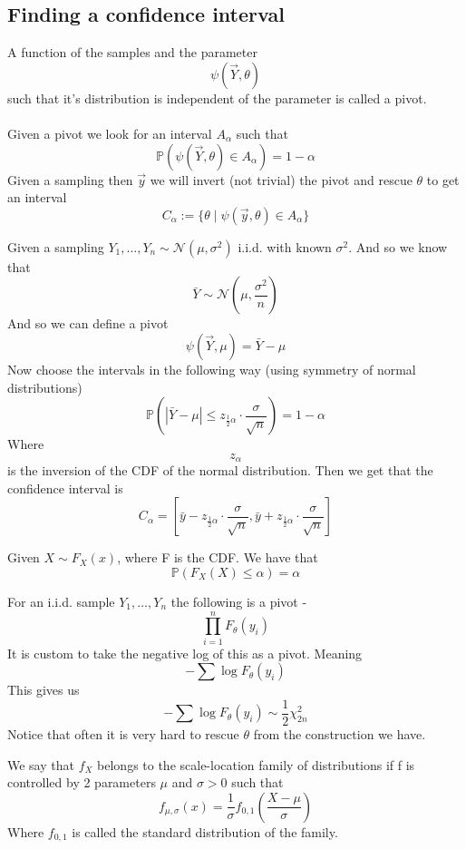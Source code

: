\documentclass[../main.tex]{subfiles}
\begin{document}
\subsection{Finding a confidence interval}
\begin{definition}
A function of the samples and the parameter
\[\psi\left(\overrightarrow{Y}, \theta\right)\]
such that it's distribution is independent of the parameter is called a pivot.\\\\
Given a pivot we look for an interval $A_{\alpha}$ such that
\[\mathbb{P}\left(\psi\left(\overrightarrow{Y},\theta\right)\in A_{\alpha}\right) = 1-\alpha\]
Given a sampling then $\overrightarrow{y}$ we will invert (not trivial) the pivot and rescue $\theta$ to get an interval
\[C_{\alpha}:=\{\theta\mid \psi(\overrightarrow{y}, \theta)\in A_{\alpha}\}\]
\end{definition}
\begin{example}
Given a sampling $Y_1,\dots,Y_n\sim\mathcal{N}(\mu, \sigma^2)$ i.i.d. with known $\sigma^2$. And so we know that
\[\bar{Y}\sim\mathcal{N}\left(\mu,\frac{\sigma^2}{n}\right)\] And so we can define a pivot
\[\psi\left(\overrightarrow{Y},\mu\right) = \bar{Y}-\mu\]
Now choose the intervals in the following way (using symmetry of normal distributions)
\[\mathbb{P}\left(|\bar{Y}-\mu|\leq z_{\frac{1}{2}\alpha} \cdot\frac{\sigma}{\sqrt{n}}\right) = 1-\alpha\]
Where \[z_{\alpha}\] is the inversion of the CDF of the normal distribution. 
Then we get that the confidence interval is 
\[C_{\alpha} = \left[\bar{y}-z_{\frac{1}{2}\alpha}\cdot\frac{\sigma}{\sqrt{n}}, \bar{y}+z_{\frac{1}{2}\alpha}\cdot\frac{\sigma}{\sqrt{n}}\right]\]
\end{example}
\begin{claim}
Given $X\sim F_X(x)$, where F is the CDF. We have that
\[\mathbb{P}(F_X(X)\leq\alpha)=\alpha\]
\end{claim}
\newpage
For an i.i.d. sample $Y_1,\dots,Y_n$ the following is a pivot - 
\[\prod_{i=1}^n F_{\theta}(y_i)\]
It is custom to take the negative log of this as a pivot. Meaning
\[-\sum \log F_{\theta}(y_i)\]
This gives us 
\[-\sum \log F_{\theta}(y_i)\sim\frac{1}{2}\chi^2_{2n}\]
Notice that often it is very hard to rescue $\theta$ from the construction we have.
\begin{definition}
We say that $f_X$ belongs to the scale-location family of distributions if f is controlled by 2 parameters $\mu$ and $\sigma>0$ such that 
\[f_{\mu,\sigma}(x) = \frac{1}{\sigma} f_{0,1}\left(\frac{X-\mu}{\sigma}\right)\]
Where $f_{0,1}$ is called the standard distribution of the family. 
\end{definition}
\end{document}
